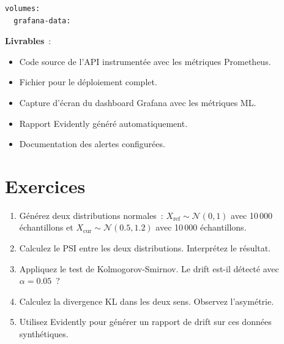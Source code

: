 \begin{miniprojet}[title=\textbf{Monitoring du mod\`ele en production}]
\begin{verbatim}
volumes:
  grafana-data:
\end{verbatim}

\textbf{Livrables}~:
\begin{itemize}
    \item Code source de l'API instrument\'ee avec les m\'etriques Prometheus.
    \item Fichier  pour le d\'eploiement complet.
    \item Capture d'\'ecran du dashboard Grafana avec les m\'etriques ML.
    \item Rapport Evidently g\'en\'er\'e automatiquement.
    \item Documentation des alertes configur\'ees.
\end{itemize}
\end{miniprojet}

\section{Exercices}
\label{sec:monitoring-exercises}

\begin{exercice}
\begin{enumerate}
    \item G\'en\'erez deux distributions normales~: $X_{\text{ref}} \sim \mathcal{N}(0, 1)$ avec 10\,000 \'echantillons et $X_{\text{cur}} \sim \mathcal{N}(0.5, 1.2)$ avec 10\,000 \'echantillons.
    \item Calculez le PSI entre les deux distributions. Interpr\'etez le r\'esultat.
    \item Appliquez le test de Kolmogorov-Smirnov. Le drift est-il d\'etect\'e avec $\alpha = 0.05$~?
    \item Calculez la divergence KL dans les deux sens. Observez l'asym\'etrie.
    \item Utilisez Evidently pour g\'en\'erer un rapport de drift sur ces donn\'ees synth\'etiques.
\end{enumerate}
\end{exercice}

